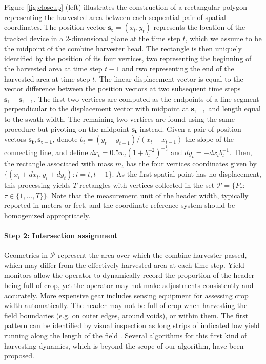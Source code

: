 Figure \ref{fig:closeup} (left) illustrates the construction of a
rectangular polygon representing the harvested area between each
sequential pair of spatial coordinates. The position vector
$\mathbf{s_t} = (x_{t}, y_{t})$ represents the location of the tracked
device in a 2-dimensional plane at the time step $t$, which we assume
to be the midpoint of the combine harvester head. The rectangle is
then uniquely identified by the position of its four vertices, two
representing the beginning of the harvested area at time step $t-1$
and two representing the end of the harvested area at time step
$t$. The linear displacement vector is equal to the vector difference
between the position vectors at two subsequent time steps
$\mathbf{s_t} - \mathbf{s_{t-1}}$. The first two vertices are computed
as the endpoints of a line segment perpendicular to the displacement
vector with midpoint at $\mathbf{s_{t-1}}$ and length equal to the
swath width. The remaining two vertices are found using the same
procedure but pivoting on the midpoint $\mathbf{s_t}$ instead. Given a
pair of position vectors $\mathbf{s_t}, \mathbf{s_{t-1}}$, denote
$b_t = (y_t - y_{t-1}) / (x_t - x_{t-1})$ the slope of the connecting
line, and define $dx_t = 0.5 w_t (1 + b_t^{-2})^{-\frac{1}{2}}$ and
$dy_t = - dx_t b_t^{-1}$. Then, the rectangle associated with mass
$m_t$ has the four vertices coordinates given by
$\{(x_{i} \pm dx_t, y_{i} \pm dy_t): i = t, t-1\}$. As the first
spatial point has no displacement, this processing yields $T$
rectangles with vertices collected in the set
$\mathcal{P} = \{P_{\tau}$: $\tau \in \{1, \dots, T\}\}$. Note that
the measurement unit of the header width, typically reported in meters
or feet, and the coordinate reference system should be homogenized
appropriately.

\paragraph{Step 2: Intersection assignment}

 Geometries in $\mathcal{P}$ represent the
area over which the combine harvester passed, which may differ from
the effectively harvested area at each time step. Yield monitors allow
the operator to dynamically record the proportion of the header being
full of crop, yet the operator may not make adjustments consistently
and accurately. More expensive gear includes sensing equipment for
assessing crop width automatically. The header may not be full of crop
when harvesting the field boundaries (e.g. on outer edges, around
voids), or within them. The first pattern can be identified by visual
inspection as long strips of indicated low yield running along the
length of the field \cite{Blackmore1999}. Several algorithms for this
first kind of harvesting dynamics, which is beyond the scope of our
algorithm, have been proposed.

